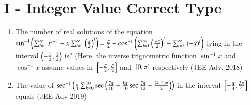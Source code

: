 \documentclass[journal]{IEEEtran}
\begin{document}
\section*{I - Integer Value Correct Type}
\begin{enumerate}
	\item{
			The number of real solutions of the equation $\sin ^{-1}\left(\sum_{i=1}^{\infty} x^{i+1}-x \sum_{i=1}^{\infty} \left(\frac{x}{2}\right)^i\right) = \frac{\pi}{2} - \cos^{-1}\left(\sum_{i=1}^{\infty}\left(\frac{-x}{2}\right)^i-\sum_{i=1}^{\infty} \left(-x\right)^i\right)$ lying in the interval $\left(-\frac{1}{2},\frac{1}{2}\right)$ is? (Here, the inverse trignometric function $\sin^{-1}x$ and $\cos^{-1}x$ assume values in ${}\left[-\frac{\pi}{2}, \frac{\pi}{2}\right]$ and ${}\left[0, \pi\right]$ respectively \hfill (JEE Adv. 2018)
}

\item{
		The value of $\sec^{-1}\left(\frac{1}{4}\sum_{k=0}^{10} \sec\left(\frac{7\pi}{10}+\frac{k\pi}{10} \sec{\frac{7\pi}{12}+\frac{\ensuremath{\left(k+1\right)}\pi}{2}}\right)\right)$ in the interval ${}\left[-\frac{\pi}{4},\frac{3\pi}{4}\right]$ equals \hfill (JEE Adv 2019)	
	}
\end{enumerate}
\end{document}
